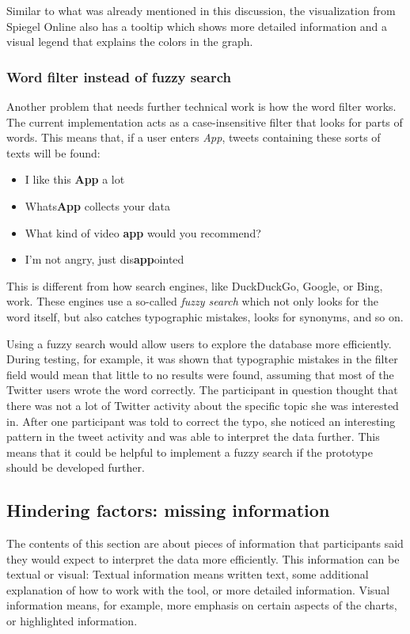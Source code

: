Similar to what was already mentioned in this discussion, the visualization from Spiegel Online also has a tooltip which shows more detailed information and a visual legend that explains the colors in the graph. 

\subsubsection*{Word filter instead of fuzzy search}
Another problem that needs further technical work is how the word filter works. The current implementation acts as a case-insensitive filter that looks for parts of words. This means that, if a user enters \emph{App}, tweets containing these sorts of texts will be found:

\begin{itemize}
    \item I like this \textbf{App} a lot
    \item Whats\textbf{App} collects your data
    \item What kind of video \textbf{app} would you recommend?
    \item I'm not angry, just dis\textbf{app}ointed
\end{itemize}

This is different from how search engines, like DuckDuckGo, Google, or Bing, work. These engines use a so-called \emph{fuzzy search} which not only looks for the word itself, but also catches typographic mistakes, looks for synonyms, and so on.

Using a fuzzy search would allow users to explore the database more efficiently. During testing, for example, it was shown that typographic mistakes in the filter field would mean that little to no results were found, assuming that most of the Twitter users wrote the word correctly. The participant in question thought that there was not a lot of Twitter activity about the specific topic she was interested in. After one participant was told to correct the typo, she noticed an interesting pattern in the tweet activity and was able to interpret the data further. This means that it could be helpful to implement a fuzzy search if the prototype should be developed further.

\subsection{Hindering factors: missing information}
The contents of this section are about pieces of information that participants said they would expect to interpret the data more efficiently. This information can be textual or visual: Textual information means written text, some additional explanation of how to work with the tool, or more detailed information. Visual information means, for example, more emphasis on certain aspects of the charts, or highlighted information.

